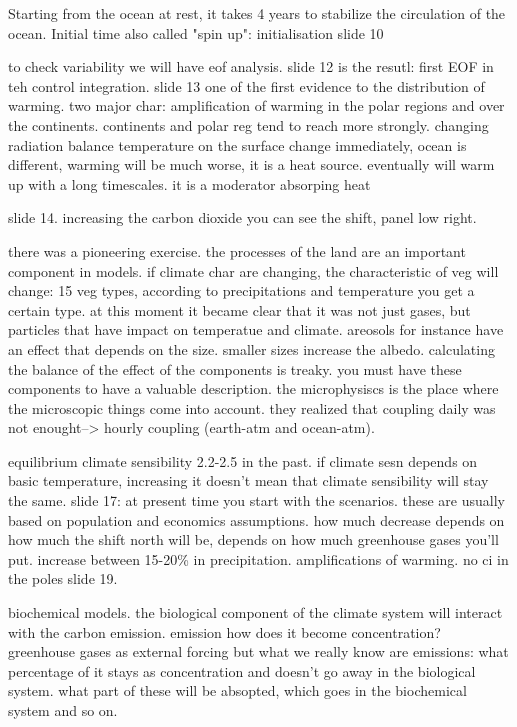 Starting from the ocean at rest, it takes 4 years to stabilize the circulation of the ocean.
Initial time also called "spin up": initialisation slide 10

to check variability we will have eof analysis. slide 12 is the resutl: first EOF in teh control integration.
slide 13 one of the first evidence to the distribution of warming. two major char: amplification of warming in the polar regions and over the continents. continents and polar reg tend to reach more strongly. changing radiation balance temperature on the surface change immediately, ocean is different, warming will be much worse, it is a heat source. eventually will warm up with a long timescales. it is a moderator absorping heat

slide 14. increasing the carbon dioxide you can see the shift, panel low right.

there was a pioneering exercise. the processes of the land are an important component in models. if climate char are changing, the characteristic of veg will change: 15 veg types, according to precipitations and temperature you get a certain type. at this moment it became clear that it was not just gases, but particles that have impact on temperatue and climate. areosols for instance have an effect that depends on the size. smaller sizes increase the albedo. calculating the balance of the effect of the components is treaky. you must have these components to have a valuable description. the microphysiscs is the place where the microscopic things come into account.
they realized that coupling daily was not enought--> hourly coupling (earth-atm and ocean-atm).

equilibrium climate sensibility 2.2-2.5 in the past. if climate sesn depends on basic temperature, increasing it doesn't mean that climate sensibility will stay the same. slide 17: at present time you start with the scenarios. these are usually based on population and economics assumptions. how much decrease depends on how much the shift north will be, depends on how much greenhouse gases you'll put. increase between 15-20\% in precipitation. amplifications of warming.
no ci in the poles slide 19.

biochemical models. the biological component of the climate system will interact with the carbon emission. emission how does it become concentration?
greenhouse gases as external forcing but what we really know are emissions: what percentage of it stays as concentration and doesn't go away in the biological system. what part of these will be absopted, which goes in the biochemical system and so on.


